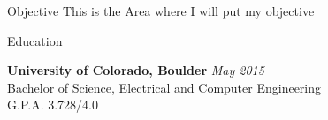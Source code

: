 \documentclass{resume} %
\begin{document}
\begin{rSection}{Objective}
This is the Area where I will put my objective
\end{rSection}


\begin{rSection}{Education}

{\bf University of Colorado, Boulder} \hfill {\em May 2015} \\ 
Bachelor of Science, Electrical and Computer Engineering \\
G.P.A. 3.728/4.0

\end{rSection}

\end{document}
